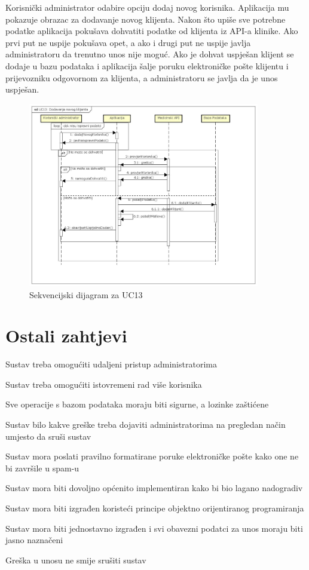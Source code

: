 			Korisnički administrator odabire opciju dodaj novog korisnika. Aplikacija mu pokazuje obrazac za dodavanje novog klijenta. Nakon što upiše sve potrebne podatke aplikacija pokušava dohvatiti podatke od klijenta iz API-a klinike. Ako prvi put ne uspije pokušava opet, a ako i drugi put ne uspije javlja administratoru da trenutno unos nije moguć. Ako je dohvat uspješan klijent se dodaje u bazu podataka i aplikacija šalje poruku elektroničke pošte klijentu i prijevozniku odgovornom za klijenta, a administratoru se javlja da je unos uspješan.
			\begin{figure}[htbp]
				\centering
				\includegraphics[width=0.9\textwidth]{dijagrami/sec_uc13}
				\caption{Sekvencijski dijagram za UC13}
				\label{fig:secUC13}
			\end{figure}
			\eject
			
				
	
		\section{Ostali zahtjevi}
		
		\begin{packed_item}
			\item Sustav treba omogućiti udaljeni pristup administratorima
			\item Sustav treba omogućiti istovremeni rad više korisnika
			\item Sve operacije s bazom podataka moraju biti sigurne, a lozinke zaštićene
			\item Sustav bilo kakve greške treba dojaviti administratorima na pregledan način umjesto da sruši sustav
			\item Sustav mora poslati pravilno formatirane poruke elektroničke pošte kako one ne bi završile u spam-u
			\item Sustav mora biti dovoljno općenito implementiran kako bi bio lagano nadogradiv
			\item Sustav mora biti izgrađen koristeći principe objektno orijentiranog programiranja
			\item Sustav mora biti jednostavno izgrađen i svi obavezni podatci za unos moraju biti jasno naznačeni
			\item Greška u unosu ne smije srušiti sustav
		\end{packed_item}
			 
			 
			 
	